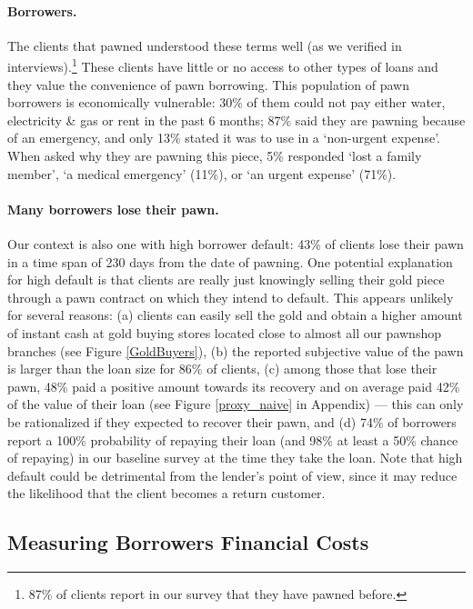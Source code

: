 \documentclass[oneside,11pt]{article}
\begin{document}
\paragraph{Borrowers.} The clients that pawned understood these terms well (as we verified in interviews).\footnote{87\% of clients report in our survey that they have pawned before.} These clients have little or no access to other types of loans and they value the convenience of pawn borrowing.  This population of pawn borrowers is economically vulnerable:  30\% of them could not pay either water, electricity \& gas or rent in the past 6 months; 87\% said they are pawning because of an emergency, and only 13\% stated it was to use in a `non-urgent expense'.  When asked why they are pawning this piece, 5\% responded `lost a family member', `a medical emergency' (11\%), or `an urgent expense' (71\%).


\paragraph{Many borrowers lose their pawn.} Our context is also one with high borrower default: 43\% of clients lose their pawn in a time span of 230 days from the date of pawning. One potential explanation for high default is that clients are really just knowingly selling their gold piece through a pawn contract on which they intend to default. This appears unlikely for several reasons: (a) clients can easily sell the gold and obtain a higher amount of instant cash at gold buying stores located close to almost all our pawnshop branches (see Figure \ref{GoldBuyers}), (b) the reported subjective value of the pawn is larger than the loan size for 86\% of clients, (c) among those that lose their pawn, 48\% paid a positive amount towards its recovery and on average paid 42\% of the value of their loan (see Figure \ref{proxy_naive} in Appendix) --- this can only be rationalized if they expected to recover their pawn, and (d) 74\% of borrowers report a 100\% probability of repaying their loan (and 98\% at least a 50\% chance of repaying) in our baseline survey at the time they take the loan.  Note that high default could be detrimental from the lender's point of view, since it may reduce the likelihood that the client becomes a return customer. 

    
\subsection{Measuring Borrowers Financial Costs} 
\label{costs}
    
\end{document}
